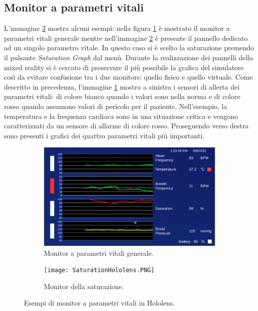 \subsection{Monitor a parametri vitali}
L'immagine \ref{pic:example-hololens} mostra alcuni esempi: nella figura \ref{pic:monitor-hololens} è mostrato il monitor a parametri vitali generale mentre  nell'immagine \ref{pic:saturation-hololens} è presente il pannello dedicato ad un singolo parametro vitale. In questo caso si è scelto la saturazione premendo il pulsante \textit{Saturation Graph} dal menù. Durante la realizzazione dei pannelli della mixed reality si è cercato di preservare il più possibile la grafica del simulatore così da evitare confusione tra i due monitors: quello fisico e quello virtuale. \newline \newline Come descritto in precedenza, l'immagine \ref{pic:monitor-hololens} mostra a sinistra i sensori di allerta dei parametri vitali: di colore bianco quando i valori sono nella norma e di colore rosso quando assumono valori di pericolo per il paziente. Nell'esempio, la temperatura e la frequenza cardiaca sono in una situazione critica e vengono caratterizzati da un sensore di allarme di colore rosso. Proseguendo verso destra sono presenti i grafici dei quattro parametri vitali più importanti.
\begin{figure}
     \centering
     \begin{subfigure}[b]{0.8\textwidth}
         \centering
         \includegraphics[width=\textwidth]{Images/hololensMonitor.PNG}
         \caption{Monitor a parametri vitali generale.}
         \label{pic:monitor-hololens}
     \end{subfigure}
     \hfill
     \begin{subfigure}[b]{0.8\textwidth}
         \centering
         \texttt{[image: SaturationHololens.PNG]}
         \caption{Monitor della saturazione.}
         \label{pic:saturation-hololens}
     \end{subfigure}
     \hfill
        \caption{Esempi di monitor a parametri vitali in Hololens.}
        \label{pic:example-hololens}
\end{figure}
